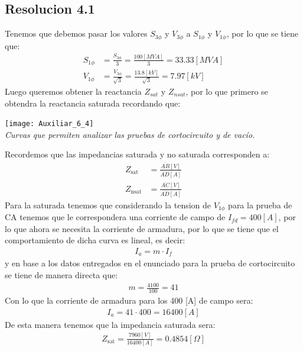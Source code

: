 \documentclass[
  11pt,
  letterpaper,
   addpoints,
   answers
  ]{exam}
\begin{document}
\begin{questions}
\begin{solution}
    \subsection*{Resolucion 4.1}
    Tenemos que debemos pasar los valores  $S_{3 \phi}$ y $V_{3 \phi}$ a $S_{1 \phi}$ y $V_{1 \phi}$, por lo que se tiene que:
    \begin{align}
        S_{1 \phi} &= \frac{S_{3 \phi}}{3} = \frac{100[MVA]}{3} = 33.33[MVA]\\
        V_{1 \phi} &= \frac{V_{3 \phi}}{\sqrt{3}} = \frac{13.8[kV]}{\sqrt{3}} = 7.97[kV]
    \end{align}
    Luego queremos obtener la reactancia $Z_{sat}$ y $Z_{nsat}$, por lo que primero se obtendra la reactancia saturada recordando que:
    \begin{center}
        \texttt{[image: Auxiliar\_6\_4]} \\
        \textit{Curvas que permiten analizar las pruebas de cortocircuito y de vacío.}
    \end{center}
    Recordemos que las impedancias saturada y no saturada corresponden a:
    \begin{align}
        Z_{\text{sat}} &= \frac{\overline{AB}[V]}{\overline{AD}[A]}\\
        Z_{\text{nsat}} &= \frac{\overline{AC}[V]}{\overline{AD}[A]} 
    \end{align}
    Para la saturada tenemos que considerando la tension de $V_{1\phi}$ para la prueba de CA tenemos que le correspondera una corriente de campo de $I_{fd} = 400[A]$, por lo que ahora se necesita la corriente de armadura, por lo que se tiene que el comportamiento de dicha curva es lineal, es decir:
    \begin{align}
        I_{a} = m \cdot I_{f} 
    \end{align}
    y en base a los datos entregados en el enunciado para la prueba de cortocircuito se tiene de manera directa que:
    \begin{align}
        m = \frac{4100}{100} = 41
    \end{align}
    Con lo que la corriente de armadura para los 400 [A] de campo sera:
    \begin{align}
        I_{a} = 41 \cdot 400 = 16400[A]
    \end{align}
    De esta manera tenemos que la impedancia saturada sera:
    \begin{align}
        Z_{\text{sat}} = \frac{7960[V]}{16400[A]} = 0.4854[\Omega]

\end{align}
\end{solution}
\end{questions}
\end{document}
